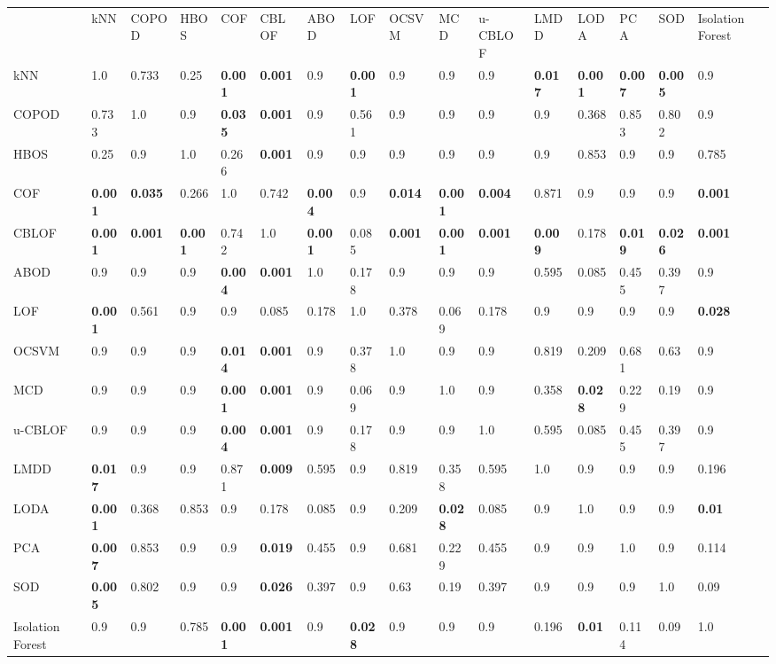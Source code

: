 \begin{tabular}{llllllllllllllll}
{} & {kNN} & {COPOD} & {HBOS} & {COF} & {CBLOF} & {ABOD} & {LOF} & {OCSVM} & {MCD} & {u-CBLOF} & {LMDD} & {LODA} & {PCA} & {SOD} & {Isolation Forest} \\
kNN & 1.0 & 0.733 & 0.25 & \textbf{0.001} & \textbf{0.001} & 0.9 & \textbf{0.001} & 0.9 & 0.9 & 0.9 & \textbf{0.017} & \textbf{0.001} & \textbf{0.007} & \textbf{0.005} & 0.9 \\
COPOD & 0.733 & 1.0 & 0.9 & \textbf{0.035} & \textbf{0.001} & 0.9 & 0.561 & 0.9 & 0.9 & 0.9 & 0.9 & 0.368 & 0.853 & 0.802 & 0.9 \\
HBOS & 0.25 & 0.9 & 1.0 & 0.266 & \textbf{0.001} & 0.9 & 0.9 & 0.9 & 0.9 & 0.9 & 0.9 & 0.853 & 0.9 & 0.9 & 0.785 \\
COF & \textbf{0.001} & \textbf{0.035} & 0.266 & 1.0 & 0.742 & \textbf{0.004} & 0.9 & \textbf{0.014} & \textbf{0.001} & \textbf{0.004} & 0.871 & 0.9 & 0.9 & 0.9 & \textbf{0.001} \\
CBLOF & \textbf{0.001} & \textbf{0.001} & \textbf{0.001} & 0.742 & 1.0 & \textbf{0.001} & 0.085 & \textbf{0.001} & \textbf{0.001} & \textbf{0.001} & \textbf{0.009} & 0.178 & \textbf{0.019} & \textbf{0.026} & \textbf{0.001} \\
ABOD & 0.9 & 0.9 & 0.9 & \textbf{0.004} & \textbf{0.001} & 1.0 & 0.178 & 0.9 & 0.9 & 0.9 & 0.595 & 0.085 & 0.455 & 0.397 & 0.9 \\
LOF & \textbf{0.001} & 0.561 & 0.9 & 0.9 & 0.085 & 0.178 & 1.0 & 0.378 & 0.069 & 0.178 & 0.9 & 0.9 & 0.9 & 0.9 & \textbf{0.028} \\
OCSVM & 0.9 & 0.9 & 0.9 & \textbf{0.014} & \textbf{0.001} & 0.9 & 0.378 & 1.0 & 0.9 & 0.9 & 0.819 & 0.209 & 0.681 & 0.63 & 0.9 \\
MCD & 0.9 & 0.9 & 0.9 & \textbf{0.001} & \textbf{0.001} & 0.9 & 0.069 & 0.9 & 1.0 & 0.9 & 0.358 & \textbf{0.028} & 0.229 & 0.19 & 0.9 \\
u-CBLOF & 0.9 & 0.9 & 0.9 & \textbf{0.004} & \textbf{0.001} & 0.9 & 0.178 & 0.9 & 0.9 & 1.0 & 0.595 & 0.085 & 0.455 & 0.397 & 0.9 \\
LMDD & \textbf{0.017} & 0.9 & 0.9 & 0.871 & \textbf{0.009} & 0.595 & 0.9 & 0.819 & 0.358 & 0.595 & 1.0 & 0.9 & 0.9 & 0.9 & 0.196 \\
LODA & \textbf{0.001} & 0.368 & 0.853 & 0.9 & 0.178 & 0.085 & 0.9 & 0.209 & \textbf{0.028} & 0.085 & 0.9 & 1.0 & 0.9 & 0.9 & \textbf{0.01} \\
PCA & \textbf{0.007} & 0.853 & 0.9 & 0.9 & \textbf{0.019} & 0.455 & 0.9 & 0.681 & 0.229 & 0.455 & 0.9 & 0.9 & 1.0 & 0.9 & 0.114 \\
SOD & \textbf{0.005} & 0.802 & 0.9 & 0.9 & \textbf{0.026} & 0.397 & 0.9 & 0.63 & 0.19 & 0.397 & 0.9 & 0.9 & 0.9 & 1.0 & 0.09 \\
Isolation Forest & 0.9 & 0.9 & 0.785 & \textbf{0.001} & \textbf{0.001} & 0.9 & \textbf{0.028} & 0.9 & 0.9 & 0.9 & 0.196 & \textbf{0.01} & 0.114 & 0.09 & 1.0 \\
\end{tabular}
